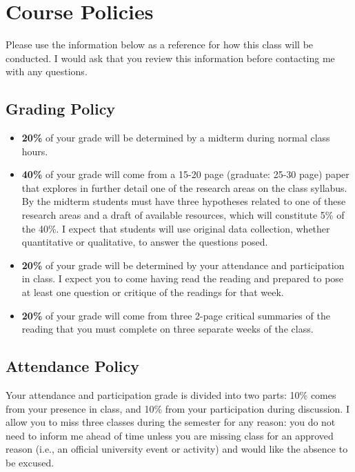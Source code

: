 \documentclass[11pt,]{article}
\begin{document}
\section{Course Policies}\label{course-policies}

Please use the information below as a reference for how this class will
be conducted. I would ask that you review this information before
contacting me with any questions.

\subsection{Grading Policy}\label{grading-policy}

\begin{itemize}
\item
  \textbf{20\%} of your grade will be determined by a midterm during
  normal class hours.
\item
  \textbf{40\%} of your grade will come from a 15-20 page (graduate:
  25-30 page) paper that explores in further detail one of the research
  areas on the class syllabus. By the midterm students must have three
  hypotheses related to one of these research areas and a draft of
  available resources, which will constitute 5\% of the 40\%. I expect
  that students will use original data collection, whether quantitative
  or qualitative, to answer the questions posed.
\item
  \textbf{20\%} of your grade will be determined by your attendance and
  participation in class. I expect you to come having read the reading
  and prepared to pose at least one question or critique of the readings
  for that week.
\item
  \textbf{20\%} of your grade will come from three 2-page critical
  summaries of the reading that you must complete on three separate
  weeks of the class.
\end{itemize}

\subsection{Attendance Policy}\label{attendance-policy}

Your attendance and participation grade is divided into two parts: 10\%
comes from your presence in class, and 10\% from your participation
during discussion. I allow you to miss three classes during the semester
for any reason: you do not need to inform me ahead of time unless you
are missing class for an approved reason (i.e., an official university
event or activity) and would like the absence to be excused.
\end{document}
